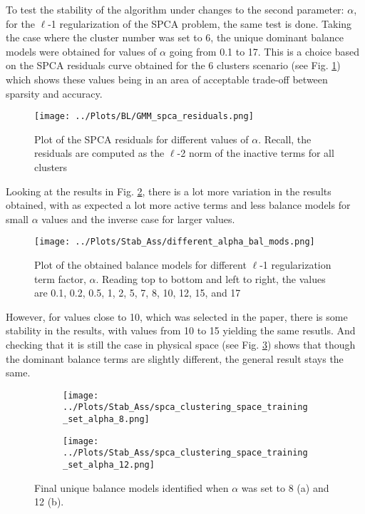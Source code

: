 \documentclass[12pt]{report} %
\begin{document}
To test the stability of the algorithm under changes to the second parameter: $\alpha$, for the $\ell$-1 regularization of the SPCA problem, the same test is done. Taking the case where the cluster number was set to 6, the unique dominant balance models were obtained for values of $\alpha$ going from 0.1 to 17. This is a choice based on the SPCA residuals curve obtained for the 6 clusters scenario (see Fig. \ref{fig:spca_residuals}) which shows these values being in an area of acceptable trade-off between sparsity and accuracy.

\begin{figure}
  \centering
  \texttt{[image: ../Plots/BL/GMM\_spca\_residuals.png]}
  \caption{Plot of the SPCA residuals for different values of $\alpha$. Recall, the residuals are computed as the $\ell$-2 norm of the inactive terms for all clusters}
  \label{fig:spca_residuals}
\end{figure}

\newpage

Looking at the results in Fig. \ref{fig:diff_alpha_bal_mods}, there is a lot more variation in the results obtained, with as expected a lot more active terms and less balance models for small $\alpha$ values and the inverse case for larger values.

\begin{figure}[htbp]
  \centering
  \texttt{[image: ../Plots/Stab\_Ass/different\_alpha\_bal\_mods.png]}
  \caption{Plot of the obtained balance models for different $\ell$-1 regularization term factor, $\alpha$. Reading top to bottom and left to right, the values are 0.1, 0.2, 0.5, 1, 2, 5, 7, 8, 10, 12, 15, and 17}
  \label{fig:diff_alpha_bal_mods}
\end{figure}

However, for values close to 10, which was selected in the paper, there is some stability in the results, with values from 10 to 15 yielding the same resutls. And checking that it is still the case in physical space (see Fig. \ref{fig:diif_alpha_clustering}) shows that though the dominant balance terms are slightly different, the general result stays the same.

\begin{figure}[htbp]
  \centering
  \begin{subfigure}[b]{0.7\textwidth}
      \texttt{[image: ../Plots/Stab\_Ass/spca\_clustering\_space\_training\_set\_alpha\_8.png]}
      \caption{}
  \end{subfigure}
  \begin{subfigure}[b]{0.7\textwidth}
      \texttt{[image: ../Plots/Stab\_Ass/spca\_clustering\_space\_training\_set\_alpha\_12.png]}
      \caption{}
  \end{subfigure}
  \caption{Final unique balance models identified when $\alpha$ was set to 8 (a) and 12 (b).}
  \label{fig:diif_alpha_clustering}
\end{figure}
\end{document}
